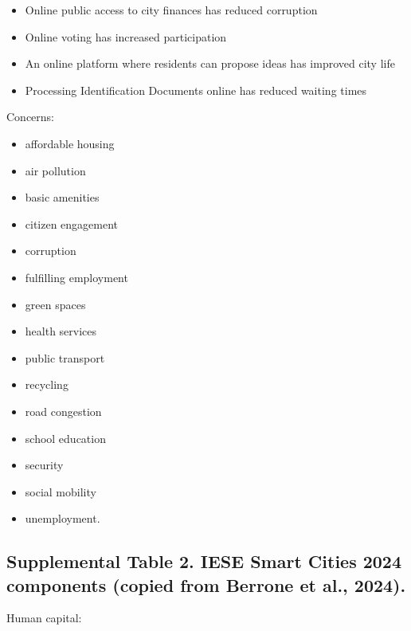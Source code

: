 \documentclass[
  english,
  12pt,
  a4paper,
]{scrartcl}
\providecommand{\tightlist}{%
  \setlength{\itemsep}{0pt}\setlength{\parskip}{0pt}}
\begin{document}
\begin{itemize}
  \begin{itemize}
  \tightlist
  \item
    Online public access to city finances has reduced corruption
  \item
    Online voting has increased participation
  \item
    An online platform where residents can propose ideas has improved
    city life
  \item
    Processing Identification Documents online has reduced waiting times
  \end{itemize}
\end{itemize}

Concerns:

\begin{itemize}
\tightlist
\item
  affordable housing
\item
  air pollution
\item
  basic amenities
\item
  citizen engagement
\item
  corruption
\item
  fulfilling employment
\item
  green spaces
\item
  health services
\item
  public transport
\item
  recycling
\item
  road congestion
\item
  school education
\item
  security
\item
  social mobility
\item
  unemployment.
\end{itemize}

\subsection{Supplemental Table 2. IESE Smart Cities 2024 components
(copied from Berrone et al.,
2024).}\label{supplemental-table-2.-iese-smart-cities-2024-components-copied-from-berrone-et-al.-2024.}

Human capital:
\end{document}
